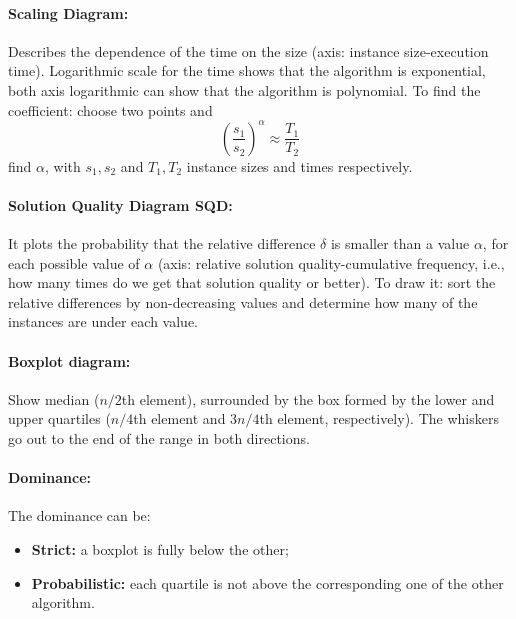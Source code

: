 \documentclass{article}
\begin{document}
	\paragraph{Scaling Diagram:} Describes the dependence of the time on the size (axis: instance size-execution time). Logarithmic scale for the time shows that the algorithm is exponential, both axis logarithmic can show that the algorithm is polynomial. To find the coefficient: choose two points and 
	$$ \left(\frac{s_1}{s_2}\right)^\alpha \approx \frac{T_1}{T_2}$$
	find $\alpha$, with $s_1, s_2$ and $T_1, T_2$ instance sizes and times respectively.\\
	
	\paragraph{Solution Quality Diagram SQD:} It plots the probability that the relative difference $\delta$ is smaller than a value $\alpha$, for each possible value of $\alpha$ (axis: relative solution quality-cumulative frequency, i.e., how many times do we get that solution quality or better). To draw it: sort the relative differences by non-decreasing values and determine how many of the instances are under each value.\\
	
	\paragraph{Boxplot diagram:} Show median ($n/2$th element), surrounded by the box formed by the lower and upper quartiles ($n/4$th element and $3n/4$th element, respectively). The whiskers go out to the end of the range in both directions.\\
	
	\paragraph{Dominance:} The dominance can be: 
	\begin{itemize}
		\item \textbf{Strict:} a boxplot is fully below the other;
		\item \textbf{Probabilistic:} each quartile is not above the corresponding one of the other algorithm.\\
	\end{itemize}
	
\end{document}
